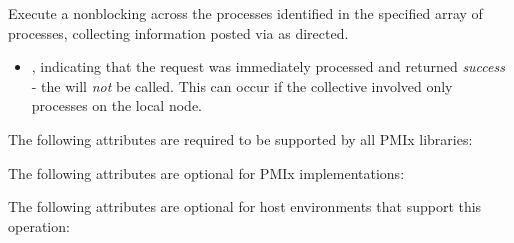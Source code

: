 Execute a nonblocking  across the processes identified in the specified array of processes, collecting information posted via  as directed.

\format


\begin{arglist}
\end{arglist}

\returnsimplenb

\returnstart
\begin{itemize}
    \item {}, indicating that the request was immediately processed and returned \textit{success} - the  will \textit{not} be called. This can occur if the collective involved only processes on the local node.
\end{itemize}
\returnend

\reqattrstart
The following attributes are required to be supported by all \ac{PMIx} libraries:


\reqattrend

\optattrstart
The following attributes are optional for \ac{PMIx} implementations:



The following attributes are optional for host environments that support this operation:


\optattrend

